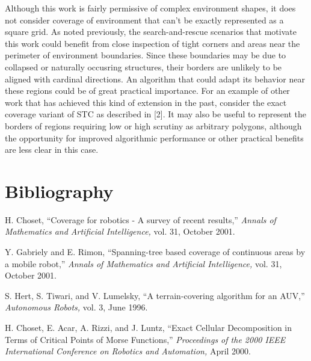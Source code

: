 \documentclass[letterpaper, 12pt, leqno]{report}
\begin{document}
Although this work is fairly permissive of complex environment shapes, it does not consider coverage of environment that can't be exactly represented as a square grid. As noted previously, the search-and-rescue scenarios that motivate this work could benefit from close inspection of tight corners and areas near the perimeter of environment boundaries. Since these boundaries may be due to collapsed or naturally occusring structures, their borders are unlikely to be aligned with cardinal directions. An algorithm that could adapt its behavior near these regions could be of great practical importance. For an example of other work that has achieved this kind of extension in the past, consider the exact coverage variant of STC as described in [2]. It may also be useful to represent the borders of regions requiring low or high scrutiny as arbitrary polygons, although the opportunity for improved algorithmic performance or other practical benefits are less clear in this case.

\chapter{Bibliography}


\noindent [1] H. Choset, ``Coverage for robotics - A survey of recent results,'' \textit{Annals of \mbox{Mathematics} and Artificial Intelligence,} vol. 31, October 2001.

\noindent [2] Y. Gabriely and E. Rimon, ``Spanning-tree based coverage of continuous areas by a mobile robot,'' \textit{Annals of \mbox{Mathematics} and Artificial Intelligence,} vol. 31, October 2001.

\noindent [3] S. Hert, S. Tiwari, and V. Lumelsky, ``A terrain-covering algorithm for an AUV,'' \textit{Autonomous Robots,} vol. 3, June 1996.

\noindent [4] H. Choset, E. Acar, A. Rizzi, and J. Luntz, ``Exact Cellular Decomposition in Terms of Critical Points of Morse Functions,'' \textit{Proceedings of the 2000 IEEE International Conference on Robotics and Automation,} April 2000.
\end{document}
